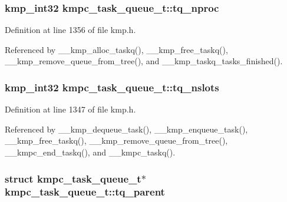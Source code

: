 \hypertarget{structkmpc__task__queue__t_af80c168362026e7d13bbbe9fbf1389b7}{
\subsubsection[{tq\-\_\-nproc}]{\setlength{\rightskip}{0pt plus 5cm}kmp\-\_\-int32 kmpc\-\_\-task\-\_\-queue\-\_\-t\-::tq\-\_\-nproc}}\label{structkmpc__task__queue__t_af80c168362026e7d13bbbe9fbf1389b7}


Definition at line 1356 of file kmp.\-h.



Referenced by \-\_\-\-\_\-kmp\-\_\-alloc\-\_\-taskq(), \-\_\-\-\_\-kmp\-\_\-free\-\_\-taskq(), \-\_\-\-\_\-kmp\-\_\-remove\-\_\-queue\-\_\-from\-\_\-tree(), and \-\_\-\-\_\-kmp\-\_\-taskq\-\_\-tasks\-\_\-finished().

\hypertarget{structkmpc__task__queue__t_ad2fe4fa78d80aad0000f62780a68f84b}{
\subsubsection[{tq\-\_\-nslots}]{\setlength{\rightskip}{0pt plus 5cm}kmp\-\_\-int32 kmpc\-\_\-task\-\_\-queue\-\_\-t\-::tq\-\_\-nslots}}\label{structkmpc__task__queue__t_ad2fe4fa78d80aad0000f62780a68f84b}


Definition at line 1347 of file kmp.\-h.



Referenced by \-\_\-\-\_\-kmp\-\_\-dequeue\-\_\-task(), \-\_\-\-\_\-kmp\-\_\-enqueue\-\_\-task(), \-\_\-\-\_\-kmp\-\_\-free\-\_\-taskq(), \-\_\-\-\_\-kmp\-\_\-remove\-\_\-queue\-\_\-from\-\_\-tree(), \-\_\-\-\_\-kmpc\-\_\-end\-\_\-taskq(), and \-\_\-\-\_\-kmpc\-\_\-taskq().

\hypertarget{structkmpc__task__queue__t_a6cb2351947e23ee8877b495428f6a59f}{
\subsubsection[{tq\-\_\-parent}]{\setlength{\rightskip}{0pt plus 5cm}struct {\bf kmpc\-\_\-task\-\_\-queue\-\_\-t}$\ast$ kmpc\-\_\-task\-\_\-queue\-\_\-t\-::tq\-\_\-parent}}\label{structkmpc__task__queue__t_a6cb2351947e23ee8877b495428f6a59f}


